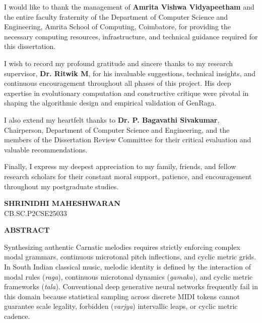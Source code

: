 \documentclass[12pt,a4paper]{report}
\begin{document}
I would like to thank the management of \textbf{Amrita Vishwa Vidyapeetham} and the entire faculty fraternity of the Department of Computer Science and Engineering, Amrita School of Computing, Coimbatore, for providing the necessary computing resources, infrastructure, and technical guidance required for this dissertation.

I wish to record my profound gratitude and sincere thanks to my research supervisor, \textbf{Dr. Ritwik M}, for his invaluable suggestions, technical insights, and continuous encouragement throughout all phases of this project. His deep expertise in evolutionary computation and constructive critique were pivotal in shaping the algorithmic design and empirical validation of GenRaga.

I also extend my heartfelt thanks to \textbf{Dr. P. Bagavathi Sivakumar}, Chairperson, Department of Computer Science and Engineering, and the members of the Dissertation Review Committee for their critical evaluation and valuable recommendations.

Finally, I express my deepest appreciation to my family, friends, and fellow research scholars for their constant moral support, patience, and encouragement throughout my postgraduate studies.

\vspace{1.5cm}
\noindent
\textbf{SHRINIDHI MAHESHWARAN} \\
CB.SC.P2CSE25033

\newpage
\begin{center}
{\Large \bfseries ABSTRACT \par}
\end{center}
\vspace{0.8cm}

Synthesizing authentic Carnatic melodies requires strictly enforcing complex modal grammars, continuous microtonal pitch inflections, and cyclic metric grids. In South Indian classical music, melodic identity is defined by the interaction of modal rules (\textit{raga}), continuous microtonal dynamics (\textit{gamaka}), and cyclic metric frameworks (\textit{tala}). Conventional deep generative neural networks frequently fail in this domain because statistical sampling across discrete MIDI tokens cannot guarantee scale legality, forbidden (\textit{varjya}) intervallic leaps, or cyclic metric cadence.
\end{document}
